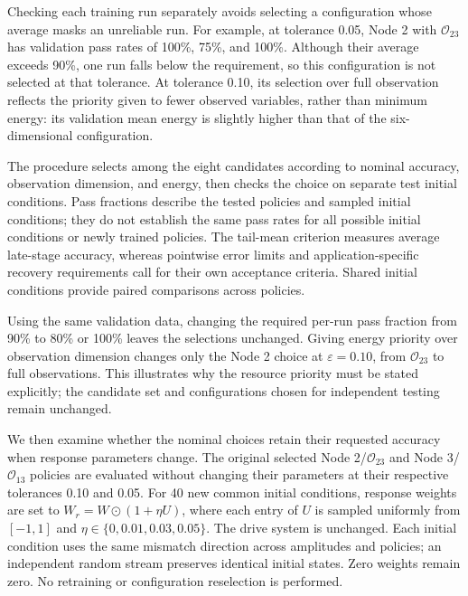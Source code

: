 \documentclass[a4paper,fleqn]{cas-dc}
\theoremstyle{plain}
\theoremstyle{definition}
\begin{document}
Checking each training run separately avoids selecting a configuration whose average masks an unreliable run. For example, at tolerance 0.05, Node 2 with $\mathcal O_{23}$ has validation pass rates of 100\%, 75\%, and 100\%. Although their average exceeds 90\%, one run falls below the requirement, so this configuration is not selected at that tolerance. At tolerance 0.10, its selection over full observation reflects the priority given to fewer observed variables, rather than minimum energy: its validation mean energy is slightly higher than that of the six-dimensional configuration.

The procedure selects among the eight candidates according to nominal accuracy, observation dimension, and energy, then checks the choice on separate test initial conditions. Pass fractions describe the tested policies and sampled initial conditions; they do not establish the same pass rates for all possible initial conditions or newly trained policies. The tail-mean criterion measures average late-stage accuracy, whereas pointwise error limits and application-specific recovery requirements call for their own acceptance criteria. Shared initial conditions provide paired comparisons across policies.

Using the same validation data, changing the required per-run pass fraction from 90\% to 80\% or 100\% leaves the selections unchanged. Giving energy priority over observation dimension changes only the Node 2 choice at $\varepsilon=0.10$, from $\mathcal O_{23}$ to full observations. This illustrates why the resource priority must be stated explicitly; the candidate set and configurations chosen for independent testing remain unchanged.

We then examine whether the nominal choices retain their requested accuracy when response parameters change. The original selected Node 2/$\mathcal O_{23}$ and Node 3/$\mathcal O_{13}$ policies are evaluated without changing their parameters at their respective tolerances 0.10 and 0.05. For 40 new common initial conditions, response weights are set to $W_r=W\odot(1+\eta U)$, where each entry of $U$ is sampled uniformly from $[-1,1]$ and $\eta\in\{0,0.01,0.03,0.05\}$. The drive system is unchanged. Each initial condition uses the same mismatch direction across amplitudes and policies; an independent random stream preserves identical initial states. Zero weights remain zero. No retraining or configuration reselection is performed.
\end{document}
